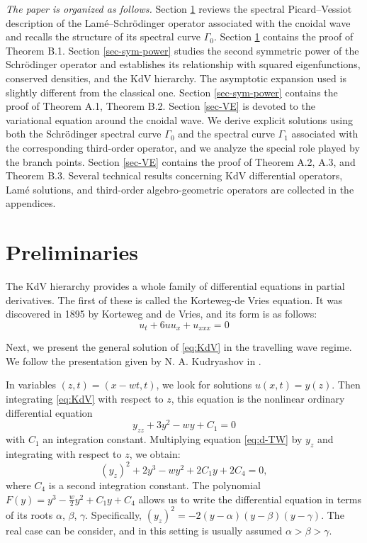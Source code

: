 \documentclass[a4paper,12pt]{article}
\begin{document}
{\it The paper is organized as follows.} Section \ref{sec-preliminaries} reviews the spectral Picard–Vessiot description of the Lam\'e–Schr\"odinger operator associated with the cnoidal wave and recalls the structure of its spectral curve $\Gamma_0$. Section \ref{sec-preliminaries} contains the proof of Theorem B.1. Section \ref{sec-sym-power} studies the second symmetric power of the Schr\"odinger operator and establishes its relationship with squared eigenfunctions, conserved densities, and the KdV hierarchy. The asymptotic expansion used is slightly different from the classical one. Section \ref{sec-sym-power} contains the proof of Theorem A.1, Theorem B.2. Section \ref{sec-VE} is devoted to the variational equation around the cnoidal wave. We derive explicit solutions using both the Schr\"odinger spectral curve $\Gamma_0$ and the spectral curve $\Gamma_1$ associated with the corresponding third-order operator, and we analyze the special role played by the branch points. Section \ref{sec-VE} contains the proof of Theorem A.2,  A.3, and Theorem B.3. Several technical results concerning KdV differential operators, Lam\'e solutions, and third-order algebro-geometric operators are collected in the appendices.




\section{Preliminaries}\label{sec-preliminaries}


The KdV hierarchy provides a whole family of differential equations in partial derivatives. The first of these is called the Korteweg-de Vries equation. It was discovered in 1895 by Korteweg and de Vries, and its form is as follows:
{\begin{equation}\label{eq:KdV}
    u_t +6 u u_x +u_{xxx} =0
\end{equation}
}

Next, we present the general solution of \eqref{eq:KdV} in the travelling wave regime. We follow  the presentation given by  N. A. Kudryashov in \cite{kudryashov2009}.


In variables $(z,t)=(x-wt,t)$, we look for solutions $u(x,t)=y(z)$. Then integrating \eqref{eq:KdV} with respect to $z$, this equation  is the nonlinear ordinary differential equation
\begin{equation}\label{eq:d-TW}
    y_{zz}+3y^2-wy+C_1 =0
\end{equation}
with $C_1$ an integration constant. Multiplying equation \eqref{eq:d-TW} by $y_z$ and integrating with respect to $z$, we obtain:
\begin{equation}\label{eq:e-TW}
    (y_z )^2 +2y^3-wy^2+2C_1 y+2C_4 =0 ,
\end{equation}
where $C_4$ is a second integration constant. The polynomial $F(y)= y^3 -\frac{w}{2}y^2+C_1 y +C_4 $  allows us to write the differential equation in terms of its roots $\alpha$, $\beta$, $\gamma$. Specifically, $(y_z )^2 =-2 ( y-\alpha)(y-\beta)(y-\gamma) $. The real case can be consider, and in this setting is usually assumed $\alpha>\beta>\gamma$.
\end{document}
